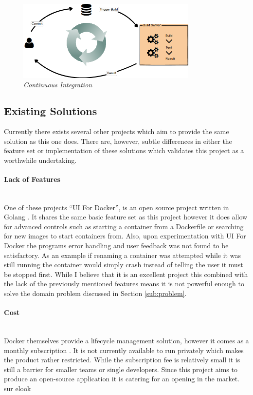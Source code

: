 \documentclass{article}
\begin{document}
\begin{figure}[!h]
\centering
\includegraphics*[width=0.8\textwidth]{images/CI}
\caption{\em Continuous Integration}
\label{fig:CI}
\end{figure}

\subsection{Existing Solutions}
Currently there exists several other projects which aim to provide the same solution as this one does. There are, however, subtle differences in either the feature set or implementation of these solutions which validates this project as a worthwhile undertaking. 

\paragraph{Lack of Features}\mbox{}\\
One of these projects ``UI For Docker'', is an open source project written in Golang \citep{UIRepo2016}. It shares the same basic feature set as this project however it does allow for advanced controls such as starting a container from a Dockerfile or searching for new images to start containers from. Also, upon experimentation with UI For Docker the programs error handling and user feedback was not found to be satisfactory. As an example if renaming a container was attempted while it was still running the container would simply crash instead of telling the user it must be stopped first. While I believe that it is an excellent project this combined with the lack of the previously mentioned features means it is not powerful enough to solve the domain problem discussed in Section \ref{sub:problem}. 

\paragraph{Cost}\mbox{}\\
Docker themselves provide a lifecycle management solution, however it comes as a monthly subscription \citep{Docker2016}. It is not currently available to run privately which makes the product rather restricted. While the subscription fee is relatively small it is still a barrier for smaller teams or single developers. Since this project aims to produce an open-source application it is catering for an opening in the market.
sur elook 
\end{document}
